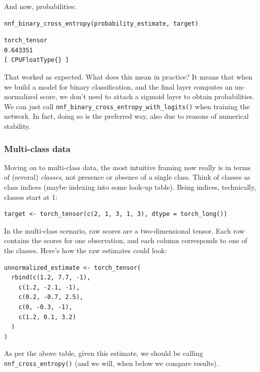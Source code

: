 \documentclass[
  letterpaper,
]{krantz}
\begin{document}
And now,
probabilities:

\begin{verbatim}
nnf_binary_cross_entropy(probability_estimate, target)
\end{verbatim}

\begin{verbatim}
torch_tensor
0.643351
[ CPUFloatType{} ]
\end{verbatim}

That worked as expected. What does this mean in practice? It means that
when we build a model for binary classification, and the final layer
computes an un-normalized score, we don't need to attach a sigmoid layer
to obtain probabilities. We can just call
\texttt{nnf\_binary\_cross\_entropy\_with\_logits()} when training the
network. In fact, doing so is the preferred way, also due to reasons of
numerical stability.

\hypertarget{multi-class-data}{%
\subsubsection{\texorpdfstring{Multi-class
data}{Multi-class data}}\label{multi-class-data}}

Moving on to multi-class data, the most intuitive framing now really is
in terms of (several) \emph{classes}, not presence or absence of a
single class. Think of classes as class indices (maybe indexing into
some look-up table). Being indices, technically, classes start at 1:

\begin{verbatim}
target <- torch_tensor(c(2, 1, 3, 1, 3), dtype = torch_long())
\end{verbatim}

In the multi-class scenario, raw scores are a two-dimensional tensor.
Each row contains the scores for one observation, and each column
corresponds to one of the classes. Here's how the raw estimates could
look:

\begin{verbatim}
unnormalized_estimate <- torch_tensor(
  rbind(c(1.2, 7.7, -1),
    c(1.2, -2.1, -1),
    c(0.2, -0.7, 2.5),
    c(0, -0.3, -1),
    c(1.2, 0.1, 3.2)
  )
)
\end{verbatim}

As per the above table, given this estimate, we should be calling
\texttt{nnf\_cross\_entropy()} (and we will, when below we compare
results).
\end{document}

